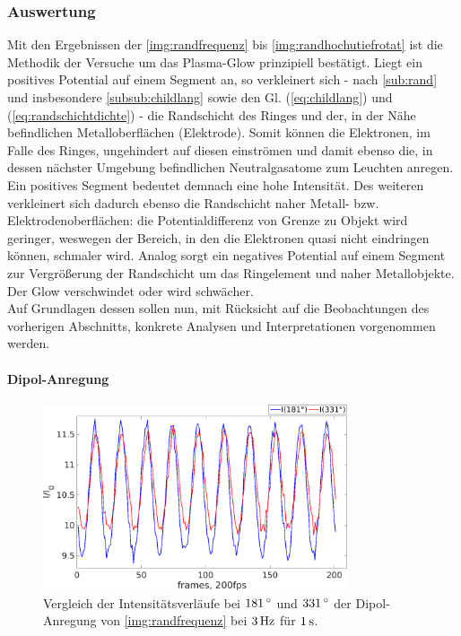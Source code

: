 \documentclass[numbers=noenddot,a4paper]{scrartcl}
\newcommand{\degree}{^\circ}
\begin{document}
			\subsubsection{Auswertung}

				Mit den Ergebnissen der \ref{img:randfrequenz} bis \ref{img:randhochutiefrotat} ist die Methodik der Versuche um das Plasma-Glow prinzipiell bestätigt. Liegt ein positives Potential auf einem Segment an, so verkleinert sich - nach \ref{sub:rand} und insbesondere \ref{subsub:childlang} sowie den Gl. (\ref{eq:childlang}) und (\ref{eq:randschichtdichte}) - die Randschicht des Ringes und der, in der Nähe befindlichen Metalloberflächen (Elektrode). Somit können die Elektronen, im Falle des Ringes, ungehindert auf diesen einströmen und damit ebenso die, in dessen nächster Umgebung befindlichen Neutralgasatome zum Leuchten anregen. Ein positives Segment bedeutet demnach eine hohe Intensität. Des weiteren verkleinert sich dadurch ebenso die Randschicht naher Metall- bzw. Elektrodenoberflächen: die Potentialdifferenz von Grenze zu Objekt wird geringer, weswegen der Bereich, in den die Elektronen quasi nicht eindringen können, schmaler wird. Analog sorgt ein negatives Potential auf einem Segment zur Vergrößerung der Randschicht um das Ringelement und naher Metallobjekte. Der Glow verschwindet oder wird schwächer.\\
				Auf Grundlagen dessen sollen nun, mit Rücksicht auf die Beobachtungen des vorherigen Abschnitts, konkrete Analysen und Interpretationen vorgenommen werden.\\

				\paragraph{Dipol-Anregung}

						\begin{figure}[!b]
							\centering
							\includegraphics[width=0.8\textwidth,height=0.5\textwidth]{figs/auswertung/intensdipol181u3313Hz1sek.png}
							\caption{Vergleich der Intensitätsverläufe bei $\unit[181]{\degree}$  und $\unit[331]{\degree}$ der Dipol-Anregung von \ref{img:randfrequenz} bei $\unit[3]{Hz}$ für $\unit[1]{s}$.}
							\label{img:intensdipol}
						\end{figure}
\end{document}
